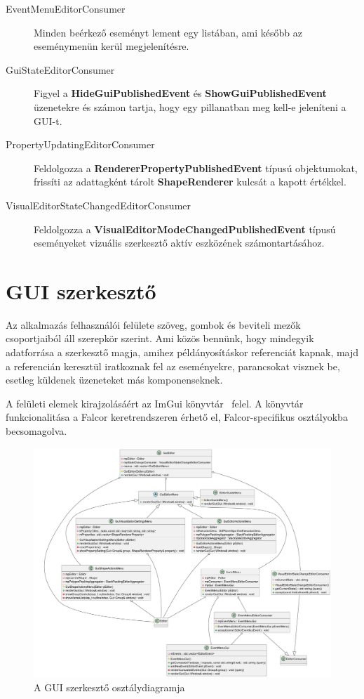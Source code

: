 \begin{description}
	\item[EventMenuEditorConsumer] Minden beérkező eseményt lement egy listában, ami később az eseménymenün kerül megjelenítésre.
	\item[GuiStateEditorConsumer] Figyel a \textbf{HideGuiPublishedEvent} és \textbf{ShowGuiPublishedEvent} üzenetekre és számon tartja, hogy egy pillanatban meg kell-e jeleníteni a GUI-t.
	\item[PropertyUpdatingEditorConsumer] Feldolgozza a \textbf{RendererPropertyPublishedEvent} típusú objektumokat, frissíti az adattagként tárolt \textbf{ShapeRenderer} kulcsát a kapott értékkel.
	\item[VisualEditorStateChangedEditorConsumer] Feldolgozza a \textbf{VisualEditorModeChangedPublishedEvent} típusú eseményeket vizuális szerkesztő aktív eszközének számontartásához.
\end{description}


\section{GUI szerkesztő}

Az alkalmazás felhasználói felülete szöveg, gombok és beviteli mezők csoportjaiból áll szerepkör szerint. Ami közös bennünk, hogy mindegyik adatforrása a szerkesztő magja, amihez példányosításkor referenciát kapnak, majd a referencián keresztül iratkoznak fel az eseményekre, parancsokat visznek be, esetleg küldenek üzeneteket más komponenseknek.

A felületi elemek kirajzolásáért az ImGui könyvtár~\cite{imgui} felel. A könyvtár funkcionalitása a Falcor keretrendszeren érhető el, Falcor-specifikus osztályokba becsomagolva.


\begin{figure}[H]
	\centering
	\includegraphics[width=1\linewidth]{images/class_gui_editor.png}
	\caption{A GUI szerkesztő osztálydiagramja}
	\label{fig:class_gui_editor-1}
\end{figure}

